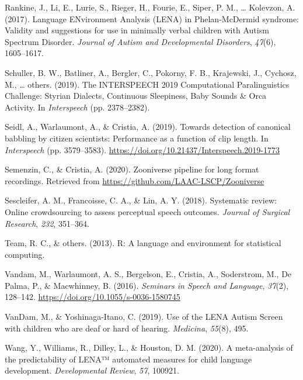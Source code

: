 \documentclass[english,,man]{apa6}
\begin{document}
\leavevmode\hypertarget{ref-rankine2017language}{}%
Rankine, J., Li, E., Lurie, S., Rieger, H., Fourie, E., Siper, P. M., \ldots{} Kolevzon, A. (2017). Language ENvironment Analysis (LENA) in Phelan-McDermid syndrome: Validity and suggestions for use in minimally verbal children with Autism Spectrum Disorder. \emph{Journal of Autism and Developmental Disorders}, \emph{47}(6), 1605--1617.

\leavevmode\hypertarget{ref-schuller2019interspeech}{}%
Schuller, B. W., Batliner, A., Bergler, C., Pokorny, F. B., Krajewski, J., Cychosz, M., \ldots{} others. (2019). The INTERSPEECH 2019 Computational Paralinguistics Challenge: Styrian Dialects, Continuous Sleepiness, Baby Sounds \& Orca Activity. In \emph{Interspeech} (pp. 2378--2382).

\leavevmode\hypertarget{ref-Seidl19}{}%
Seidl, A., Warlaumont, A., \& Cristia, A. (2019). Towards detection of canonical babbling by citizen scientists: Performance as a function of clip length. In \emph{Interspeech} (pp. 3579--3583). \url{https://doi.org/10.21437/Interspeech.2019-1773}

\leavevmode\hypertarget{ref-semenzin2020zooniverse}{}%
Semenzin, C., \& Cristia, A. (2020). Zooniverse pipeline for long format recordings. Retrieved from \url{https://github.com/LAAC-LSCP/Zooniverse}

\leavevmode\hypertarget{ref-sescleifer2018systematic}{}%
Sescleifer, A. M., Francoisse, C. A., \& Lin, A. Y. (2018). Systematic review: Online crowdsourcing to assess perceptual speech outcomes. \emph{Journal of Surgical Research}, \emph{232}, 351--364.

\leavevmode\hypertarget{ref-team2013r}{}%
Team, R. C., \& others. (2013). R: A language and environment for statistical computing.

\leavevmode\hypertarget{ref-vandam2016homebank}{}%
Vandam, M., Warlaumont, A. S., Bergelson, E., Cristia, A., Soderstrom, M., De Palma, P., \& Macwhinney, B. (2016). \emph{Seminars in Speech and Language}, \emph{37}(2), 128--142. \url{https://doi.org/10.1055/s-0036-1580745}

\leavevmode\hypertarget{ref-vandam2019use}{}%
VanDam, M., \& Yoshinaga-Itano, C. (2019). Use of the LENA Autism Screen with children who are deaf or hard of hearing. \emph{Medicina}, \emph{55}(8), 495.

\leavevmode\hypertarget{ref-wang2020meta}{}%
Wang, Y., Williams, R., Dilley, L., \& Houston, D. M. (2020). A meta-analysis of the predictability of LENA™ automated measures for child language development. \emph{Developmental Review}, \emph{57}, 100921.
\end{document}
